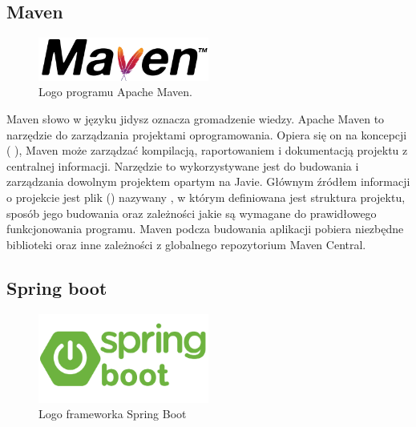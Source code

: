 \subsection{Maven}

\begin{figure}[htbp!]
    \centering
    \includegraphics[width=0.5\textwidth]{images/mavenLogo.png}
    \caption{Logo programu Apache Maven\cite{mavenSite}.}
    \label{fig:enter-label}
\end{figure}

Maven słowo w języku jidysz oznacza gromadzenie wiedzy. Apache Maven to narzędzie do zarządzania projektami oprogramowania. Opiera się on na koncepcji  ( ), Maven może zarządzać kompilacją, raportowaniem i dokumentacją projektu z centralnej informacji. Narzędzie to wykorzystywane jest do budowania i zarządzania dowolnym projektem opartym na Javie. Głównym źródłem informacji o projekcie jest plik  () nazywany , w którym definiowana jest struktura projektu, sposób jego budowania oraz zależności jakie są wymagane do prawidłowego funkcjonowania programu. Maven podcza budowania aplikacji pobiera niezbędne biblioteki oraz inne zależności z globalnego repozytorium Maven Central\cite{mavenSite}.

\subsection{Spring boot}

\begin{figure}[!htbp]
    \centering
    \includegraphics[width=0.5\textwidth]{images/springboot/springBootLogo.png}
    \caption{Logo frameworka Spring Boot \cite{springLogo}}
    \label{fig:enter-label}
\end{figure}


